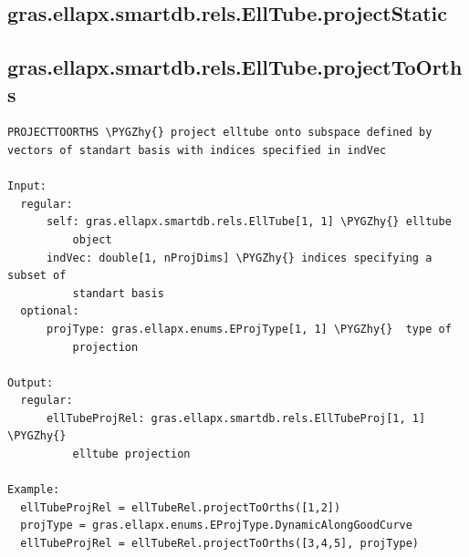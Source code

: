 \documentclass[letterpaper,10pt,english]{sphinxmanual}
\def\PYGZhy{\char`\-}
\begin{document}
\subsection{gras.ellapx.smartdb.rels.EllTube.projectStatic}
\label{chap_functions:gras-ellapx-smartdb-rels-elltube-projectstatic}

\subsection{gras.ellapx.smartdb.rels.EllTube.projectToOrths}
\label{chap_functions:gras-ellapx-smartdb-rels-elltube-projecttoorths}
\begin{Verbatim}[commandchars=\\\{\}]
PROJECTTOORTHS \PYGZhy{} project elltube onto subspace defined by
vectors of standart basis with indices specified in indVec

Input:
  regular:
      self: gras.ellapx.smartdb.rels.EllTube[1, 1] \PYGZhy{} elltube
          object
      indVec: double[1, nProjDims] \PYGZhy{} indices specifying a subset of
          standart basis
  optional:
      projType: gras.ellapx.enums.EProjType[1, 1] \PYGZhy{}  type of
          projection

Output:
  regular:
      ellTubeProjRel: gras.ellapx.smartdb.rels.EllTubeProj[1, 1] \PYGZhy{}
          elltube projection

Example:
  ellTubeProjRel = ellTubeRel.projectToOrths([1,2])
  projType = gras.ellapx.enums.EProjType.DynamicAlongGoodCurve
  ellTubeProjRel = ellTubeRel.projectToOrths([3,4,5], projType)
\end{Verbatim}
\end{document}
